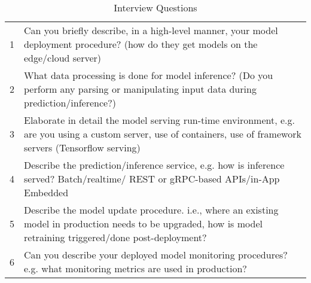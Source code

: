 
\begin{table}
    \caption{Interview Questions}
    \begin{tabular}{p{0.1cm}p{13cm}} 
    \hline
        1 & Can you briefly describe, in a high-level manner, your model deployment procedure? (how do they get models on the edge/cloud server) \\   
        
        2 & What data processing is done for model inference? (Do you perform any parsing or manipulating input data during prediction/inference?) \\
        
        3 & Elaborate in detail the model serving run-time environment, e.g. are you using a custom server, use of containers, use of framework servers (Tensorflow serving) \\
        
        4 & Describe the prediction/inference service, e.g. how is inference served? Batch/realtime/ REST or gRPC-based APIs/in-App Embedded \\
        
        5 & Describe the model update procedure. i.e., where an existing model in production needs to be upgraded, how is model retraining triggered/done post-deployment? \\
        
        6 & Can you describe your deployed model monitoring procedures? e.g. what monitoring metrics are used in production? \\

    \hline    
    \end{tabular}
  \label{tab: interview_questions}
\end{table}

